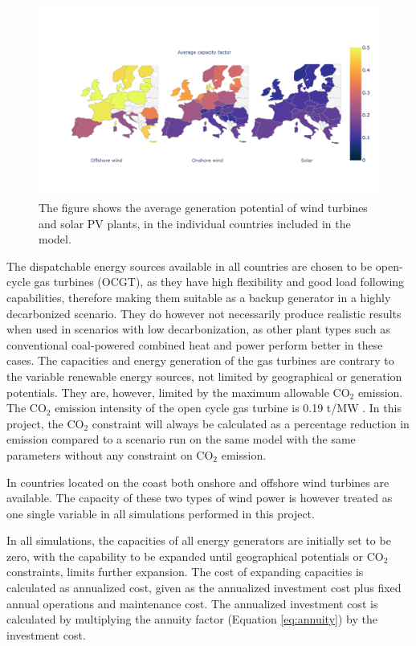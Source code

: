 \begin{figure}[h]\centerfloat
	\includegraphics[width=1.3\textwidth]{./Images/wind_availability}
	\caption{The figure shows the average generation potential of wind turbines and solar PV plants, in the individual countries included in the model.  }
	\label{fig:capacity_factor}
\end{figure}



The dispatchable energy sources available in all countries are chosen to be open-cycle gas turbines (OCGT), as they have high flexibility and good load following capabilities, therefore making them suitable as a backup generator in a highly decarbonized scenario. They do however not necessarily produce realistic results when used in scenarios with low decarbonization, as other plant types such as conventional coal-powered combined heat and power perform better in these cases. The capacities and energy generation of the gas turbines are contrary to the variable renewable energy sources, not limited by geographical or generation potentials. They are, however, limited by the maximum allowable $\text{CO}_2$ emission. The $\text{CO}_2$ emission intensity of the open cycle gas turbine is 0.19 t/MW \cite{PyPSA_euro_30_model}. In this project, the $\text{CO}_2$ constraint will always be calculated as a percentage reduction in emission compared to a scenario run on the same model with the same parameters without any constraint on $\text{CO}_2$ emission. 

In countries located on the coast both onshore and offshore wind turbines are available. The capacity of these two types of wind power is however treated as one single variable in all simulations performed in this project. 

In all simulations, the capacities of all energy generators are initially set to be zero, with the capability to be expanded until geographical potentials or $\text{CO}_2$ constraints, limits further expansion. The cost of expanding capacities is calculated as annualized cost, given as the annualized investment cost plus fixed annual operations and maintenance cost. The annualized investment cost is calculated by multiplying the annuity factor (Equation \ref{eq:annuity}) by the investment cost. 

